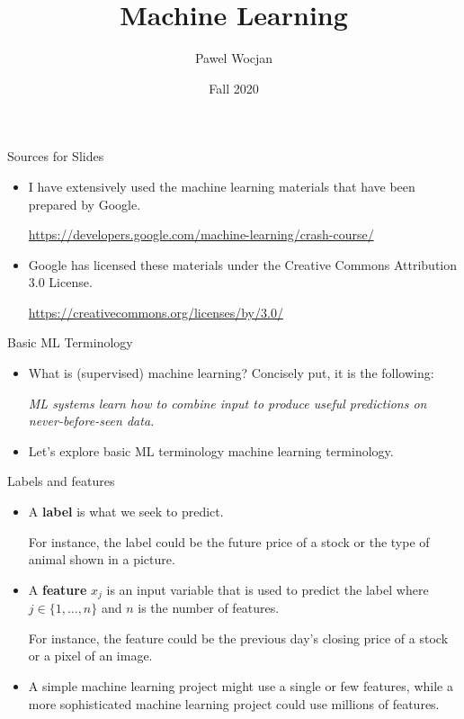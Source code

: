 \documentclass{beamer}
\title[ML]{Machine Learning}
\author{Pawel Wocjan}
\institute{University of Central Florida}
\date{Fall 2020}
\begin{document}
\begin{frame}
  \titlepage
\end{frame}

\begin{frame}{Sources for Slides}

\begin{itemize}
\item I have extensively used the machine learning materials that have been prepared by Google. 

\medskip
\footnotesize{ 
\url{https://developers.google.com/machine-learning/crash-course/}
}

\item Google has licensed these materials under the Creative Commons Attribution 3.0 License.

\medskip
\footnotesize{ 
\url{https://creativecommons.org/licenses/by/3.0/}
}
\end{itemize}
\end{frame}


\begin{frame}{Basic ML Terminology}

\begin{itemize}
\item What is (supervised) machine learning? Concisely put, it is the following:

\medskip
\emph{ML systems learn how to combine input to produce useful predictions on never-before-seen data.}

\medskip
\item Let's explore basic ML terminology machine learning terminology.
\end{itemize}
\end{frame}


\begin{frame}{Labels and features}

\begin{itemize}
\item 
A {\bf label} is what we seek to predict.

\medskip
For instance, the label could be the future price of a stock or the type of animal shown in a picture.

\medskip
\item 
A {\bf feature} $x_j$ is an input variable that is used to predict the label where $j\in\{1,\ldots,n\}$ and $n$ is the number of features.

\medskip
For instance, the feature could be the previous day's closing price of a stock or a pixel of an image.

\medskip
\item A simple machine learning project might use a single or few features, while a more sophisticated machine learning project could use millions of features. 
\end{itemize}

\end{frame}
\end{document}

